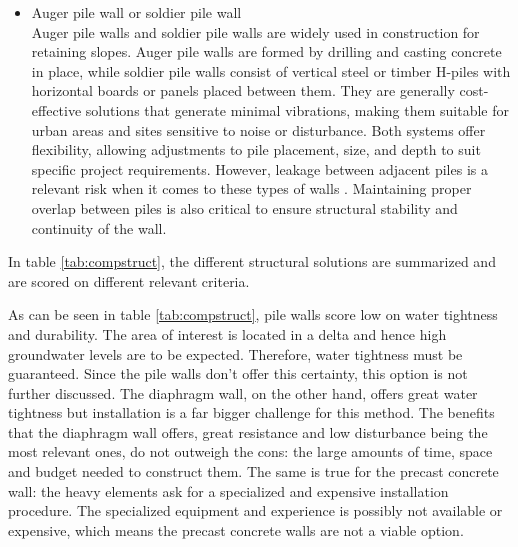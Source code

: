 \begin{itemize}
    \item Auger pile wall or soldier pile wall\\
    Auger pile walls and soldier pile walls are widely used in construction for retaining slopes. Auger pile walls are formed by drilling and casting concrete in place, while soldier pile walls consist of vertical steel or timber H-piles with horizontal boards or panels placed between them. They are generally cost-effective solutions that generate minimal vibrations, making them suitable for urban areas and sites sensitive to noise or disturbance. Both systems offer flexibility, allowing adjustments to pile placement, size, and depth to suit specific project requirements. However, leakage between adjacent piles is a relevant risk when it comes to these types of walls \autocite{mandykorffReaderDeepExcavations2023}. Maintaining proper overlap between piles is also critical to ensure structural stability and continuity of the wall.
\end{itemize}

In table \ref{tab:compstruct}, the different structural solutions are summarized and are scored on different relevant criteria.

\begin{table}[H]
\centering
\caption{Comparison of structural solutions}
\label{tab:compstruct}
\end{table}

As can be seen in table \ref{tab:compstruct}, pile walls score low on water tightness and durability. The area of interest is located in a delta and hence high groundwater levels are to be expected. Therefore, water tightness must be guaranteed. Since the pile walls don't offer this certainty, this option is not further discussed. The diaphragm wall, on the other hand, offers great water tightness but installation is a far bigger challenge for this method. The benefits that the diaphragm wall offers, great resistance and low disturbance being the most relevant ones, do not outweigh the cons: the large amounts of time, space and budget needed to construct them. The same is true for the precast concrete wall: the heavy elements ask for a specialized and expensive installation procedure. The specialized equipment and experience is possibly not available or expensive, which means the precast concrete walls are not a viable option.

